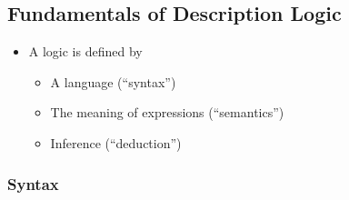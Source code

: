 \subsection{Fundamentals of Description Logic}
\begin{itemize}
	\item A logic is defined by
	\begin{itemize}
		\item A language (``syntax'')
		\item The meaning of expressions (``semantics'')
		\item Inference (``deduction'')
	\end{itemize}
\end{itemize}
\subsubsection{Syntax}
